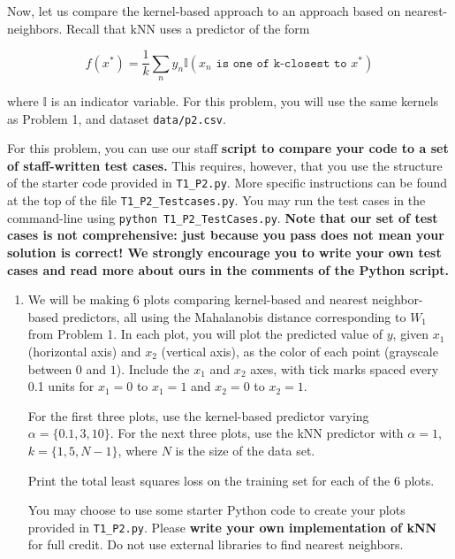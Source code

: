 \documentclass[submit]{harvardml}
\begin{document}
\begin{problem}

Now, let us compare the kernel-based approach to an approach based on
nearest-neighbors.  Recall that kNN uses a predictor of the form

  \begin{equation*}
    f(x^*) = \frac{1}{k} \sum_n y_n \mathbb{I}(x_n \texttt{ is one of k-closest to } x^*)
  \end{equation*}

\noindent where $\mathbb{I}$ is an indicator variable. For this problem, you will use the same kernels as Problem 1, and dataset \verb|data/p2.csv|. 

For this problem, you can use our staff \textbf{script to compare your code to a set of staff-written test cases.} This requires, however, that you use the structure of the starter code provided in \texttt{T1\_P2.py}. More specific instructions can be found at the top of the file \texttt{T1\_P2\_Testcases.py}. You may run the test cases in the command-line using \texttt{python T1\_P2\_TestCases.py}.
\textbf{Note that our set of test cases is not comprehensive: just because you pass does not mean your solution is correct! We strongly encourage you to write your own test cases and read more about ours in the comments of the Python script.}


\begin{enumerate}

\item We will be making 6 plots comparing kernel-based and nearest
  neighbor-based predictors, all using the Mahalanobis distance
  corresponding to $W_1$ from Problem 1. In each plot, you will plot
  the predicted value of $y$, given $x_1$ (horizontal axis) and $x_2$
  (vertical axis), as the color of each point (grayscale
  between $0$ and $1$). Include the $x_1$ and $x_2$ axes, with tick marks spaced every 0.1 units
  for $x_1=0$ to $x_1=1$ and $x_2=0$ to $x_2=1$.
  
  For the first three plots, use the kernel-based predictor varying
  $\alpha = \{0.1,3,10\}$.  For the next three plots, use the kNN
  predictor with $\alpha = 1$, $k=\{1,5,N-1\}$, where $N$ is the size
  of the data set.

  Print the total least squares loss on the training set for each of
  the 6 plots.
  
  You may choose to use some starter Python code to create your plots
  provided in \verb|T1_P2.py|.  Please \textbf{write your own
    implementation of kNN} for full credit.  Do not use external
  libraries to find nearest neighbors.
  

\end{enumerate}
\end{problem}
\end{document}
